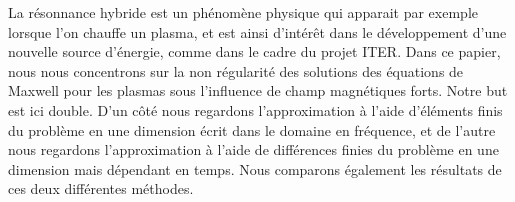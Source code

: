 La r\'esonnance hybride est un ph\'enom\`ene physique qui apparait par exemple lorsque l'on chauffe un plasma, et est ainsi d'int\'er\^et dans le d\'eveloppement d'une nouvelle source d'\'energie, comme dans le cadre du projet ITER. Dans ce papier, nous nous concentrons sur la non r\'egularit\'e des solutions des \'equations de Maxwell pour les plasmas sous l'influence de champ magn\'etiques forts. Notre but est ici double. D'un c\^ot\'e nous regardons l'approximation \`a l'aide d'\'el\'ements finis du probl\`eme en une dimension \'ecrit dans le domaine en fr\'equence, et de l'autre nous regardons l'approximation \`a l'aide de diff\'erences finies du probl\`eme en une dimension mais d\'ependant en temps. Nous comparons \'egalement les r\'esultats de ces deux diff\'erentes m\'ethodes.